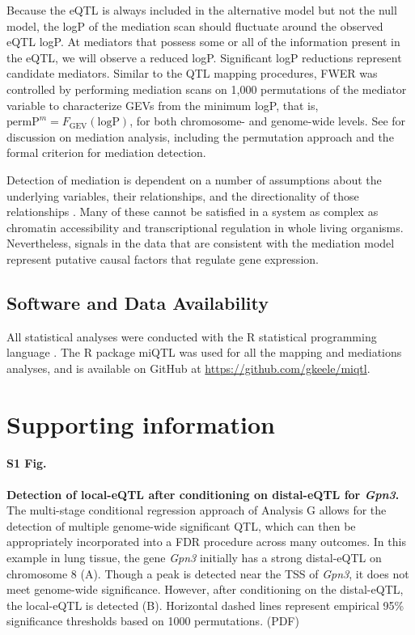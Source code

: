 \documentclass[10pt,letterpaper]{article}
\newcommand{\permpmed}{\text{permP}^{m}}
\begin{document}
Because the eQTL is always included in the alternative model but not the null model, the logP of the mediation scan should fluctuate around the observed eQTL logP. At mediators that possess some or all of the information present in the eQTL, we will observe a reduced logP. Significant logP reductions represent candidate mediators. Similar to the QTL mapping procedures, FWER was controlled by performing mediation scans on 1,000 permutations of the mediator variable to characterize GEVs from the minimum logP, that is, $\permpmed = F_{\text{GEV}}(\text{logP})$, for both chromosome- and genome-wide levels. See  for discussion on mediation analysis, including the permutation approach and the formal criterion for mediation detection.

Detection of mediation is dependent on a number of assumptions about the underlying variables, their relationships, and the directionality of those relationships \cite{Mackinnon2007}. Many of these cannot be satisfied in a system as complex as chromatin accessibility and transcriptional regulation in whole living organisms. Nevertheless, signals in the data that are consistent with the mediation model represent putative causal factors that regulate gene expression.

\subsection*{Software and Data Availability}

All statistical analyses were conducted with the R statistical programming language \cite{RSoftware2019}. The R package miQTL was used for all the mapping and mediations analyses, and is available on GitHub at \url{https://github.com/gkeele/miqtl}.

\section*{Supporting information}

\paragraph*{S1 Fig.}
\label{S_conditional_scan}
{\bf Detection of local-eQTL after conditioning on distal-eQTL for \textit{Gpn3}.} 
The multi-stage conditional regression approach of Analysis G allows for the detection of multiple genome-wide significant QTL, which can then be appropriately incorporated into a FDR procedure across many outcomes. In this example in lung tissue, the gene \textit{Gpn3} initially has a strong distal-eQTL on chromosome 8 (A). Though a peak is detected near the TSS of \textit{Gpn3}, it does not meet genome-wide significance. However, after conditioning on the distal-eQTL, the local-eQTL is detected (B). Horizontal dashed lines represent empirical 95\% significance thresholds based on 1000 permutations. (PDF)
\end{document}
